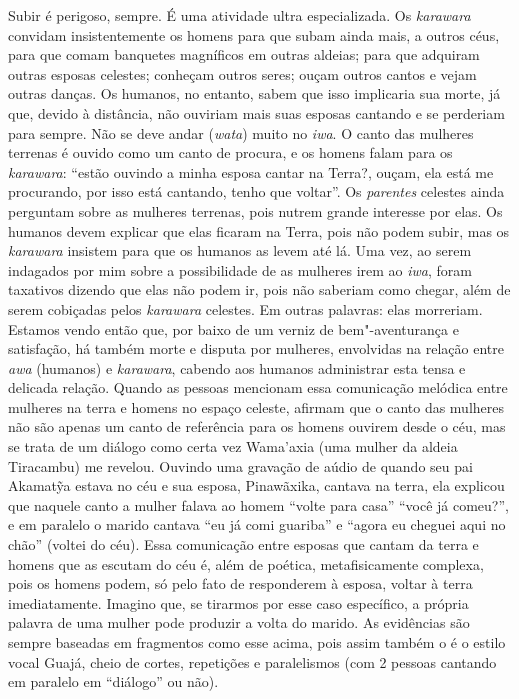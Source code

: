 Subir é perigoso, sempre. É uma atividade ultra especializada. Os
\emph{karawara} convidam insistentemente os homens para que subam ainda
mais, a outros céus, para que comam banquetes magníficos em outras
aldeias; para que adquiram outras esposas celestes; conheçam outros
seres; ouçam outros cantos e vejam outras danças. Os humanos, no
entanto, sabem que isso implicaria sua morte, já que, devido à
distância, não ouviriam mais suas esposas cantando e se perderiam para
sempre. Não se deve andar (\emph{wata}) muito no \emph{iwa}. O canto das
mulheres terrenas é ouvido como um canto de procura, e os homens falam
para os \emph{karawara}: ``estão ouvindo a minha esposa cantar na Terra?,
ouçam, ela está me procurando, por isso está cantando, tenho que
voltar''. Os \emph{parentes} celestes ainda perguntam sobre as mulheres
terrenas, pois nutrem grande interesse por elas. Os humanos devem
explicar que elas ficaram na Terra, pois não podem subir, mas os
\emph{karawara} insistem para que os humanos as levem até lá. Uma vez,
ao serem indagados por mim sobre a possibilidade de as mulheres irem ao
\emph{iwa}, foram taxativos dizendo que elas não podem ir, pois não
saberiam como chegar, além de serem cobiçadas pelos \emph{karawara}
celestes. Em outras palavras: elas morreriam. Estamos vendo então que,
por baixo de um verniz de bem"-aventurança e satisfação, há também morte
e disputa por mulheres, envolvidas na relação entre \emph{awa} (humanos)
e \emph{karawara}, cabendo aos humanos administrar esta tensa e delicada
relação. Quando as pessoas mencionam essa comunicação melódica entre
mulheres na terra e homens no espaço celeste, afirmam que o canto das
mulheres não são apenas um canto de referência para os homens ouvirem
desde o céu, mas se trata de um diálogo como certa vez Wama'axia (uma mulher
da aldeia Tiracambu) me revelou. Ouvindo uma gravação de aúdio de quando
seu pai Akamatỹa estava no céu e sua esposa, Pinawãxika, cantava na
terra, ela explicou que naquele canto a mulher falava ao homem ``volte
para casa'' ``você já comeu?'', e em paralelo o marido cantava ``eu já
comi guariba'' e ``agora eu cheguei aqui no chão'' (voltei do céu). Essa
comunicação entre esposas que cantam da terra e homens que as escutam do
céu é, além de poética, metafisicamente complexa, pois os homens podem,
só pelo fato de responderem à esposa, voltar à terra imediatamente.
Imagino que, se tirarmos por esse caso específico, a própria palavra de
uma mulher pode produzir a volta do marido. As evidências são sempre
baseadas em fragmentos como esse acima, pois assim também o é o estilo
vocal Guajá, cheio de cortes, repetições e paralelismos (com 2 pessoas
cantando em paralelo em ``diálogo'' ou não).

